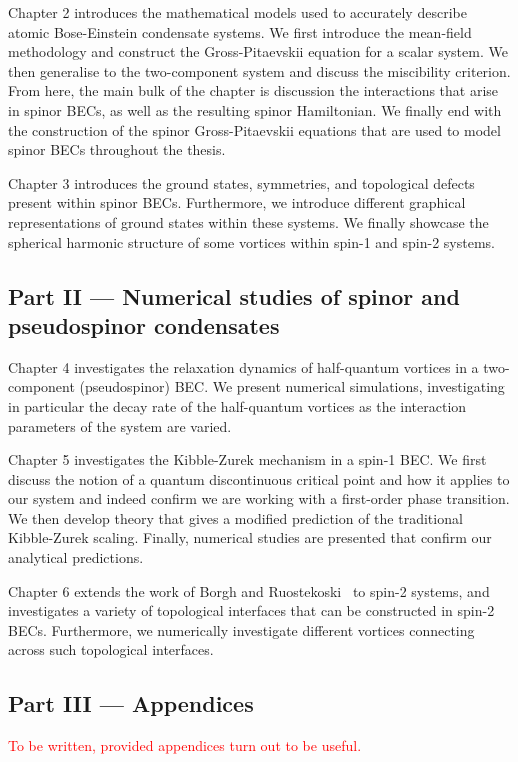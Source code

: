 Chapter 2 introduces the mathematical models used to accurately describe atomic
Bose-Einstein condensate systems.
We first introduce the mean-field methodology and construct the Gross-Pitaevskii
equation for a scalar system.
We then generalise to the two-component system and discuss the miscibility
criterion.
From here, the main bulk of the chapter is discussion the interactions that
arise in spinor BECs, as well as the resulting spinor Hamiltonian.
We finally end with the construction of the spinor Gross-Pitaevskii equations
that are used to model spinor BECs throughout the thesis.

Chapter 3 introduces the ground states, symmetries, and topological defects
present within spinor BECs.
Furthermore, we introduce different graphical representations of ground states
within these systems.
We finally showcase the spherical harmonic structure of some vortices within
spin-1 and spin-2 systems.

\subsection*{Part II --- Numerical studies of spinor and pseudospinor
    condensates}
Chapter 4 investigates the relaxation dynamics of half-quantum vortices in a
two-component (pseudospinor) BEC\@.
We present numerical simulations, investigating in particular the decay rate of
the half-quantum vortices as the interaction parameters of the system are
varied.

Chapter 5 investigates the Kibble-Zurek mechanism in a spin-1 BEC\@.
We first discuss the notion of a quantum discontinuous critical point and how it
applies to our system and indeed confirm we are working with a first-order phase
transition.
We then develop theory that gives a modified prediction of the traditional
Kibble-Zurek scaling.
Finally, numerical studies are presented that confirm our analytical
predictions.

Chapter 6 extends the work of Borgh and Ruostekoski~\cite{Borgh2012, Borgh2013,
    Borgh2014} to spin-2 systems, and investigates a variety of topological
interfaces that can be constructed in spin-2 BECs.
Furthermore, we numerically investigate different vortices connecting across
such topological interfaces.

\subsection*{Part III --- Appendices}
\textcolor{red}{To be written, provided appendices turn out to be useful.}
